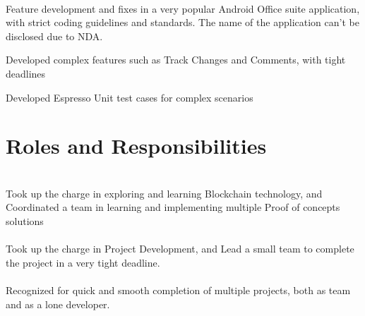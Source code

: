 \documentclass[]{deedy-resume-openfont}
\begin{document}
\\
Feature development and fixes in a very popular Android Office suite application, with strict coding guidelines and standards. The name of the application can’t be disclosed due to NDA.\\
\begin{tightemize}
	\item Developed complex features such as Track Changes and Comments, with tight deadlines
	\item Developed Espresso Unit test cases for complex scenarios
\end{tightemize}
\sectionsep


\section{Roles and Responsibilities}
  \\
Took up the charge in exploring and learning Blockchain technology, and Coordinated a team in learning and implementing multiple Proof of concepts solutions\\
\sectionsep
{}  \\
Took up the charge in Project Development, and Lead a small team to complete the project in a very tight deadline.\\
\sectionsep
{}  \\
Recognized for quick and smooth completion of multiple projects, both as team and as a lone developer.\\
\sectionsep
\ 
\end{document}
